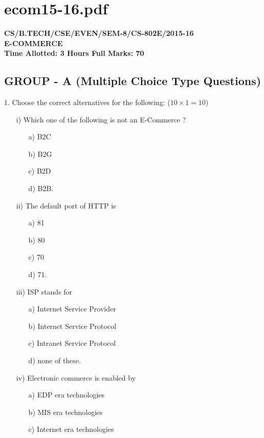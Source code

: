 \newpage
\section*{ecom15-16.pdf}
\textbf{CS/B.TECH/CSE/EVEN/SEM-8/CS-802E/2015-16} \\
\textbf{E-COMMERCE} \\
\textbf{Time Allotted: 3 Hours \hfill Full Marks: 70}

\subsection*{GROUP - A (Multiple Choice Type Questions)}
1. Choose the correct alternatives for the following: ($10 \times 1 = 10$)
\begin{enumerate}
    \item[i)] Which one of the following is not an E-Commerce ?
    \begin{enumerate}
        \item[a)] B2C
        \item[b)] B2G
        \item[c)] B2D
        \item[d)] B2B.
    \end{enumerate}
    \item[ii)] The default port of HTTP is
    \begin{enumerate}
        \item[a)] 81
        \item[b)] 80
        \item[c)] 70
        \item[d)] 71.
    \end{enumerate}
    \item[iii)] ISP stands for
    \begin{enumerate}
        \item[a)] Internet Service Provider
        \item[b)] Internet Service Protocol
        \item[c)] Intranet Service Protocol
        \item[d)] none of these.
    \end{enumerate}
    \item[iv)] Electronic commerce is enabled by
    \begin{enumerate}
        \item[a)] EDP era technologies
        \item[b)] MIS era technologies
        \item[c)] Internet era technologies

\end{enumerate}
\end{enumerate}
